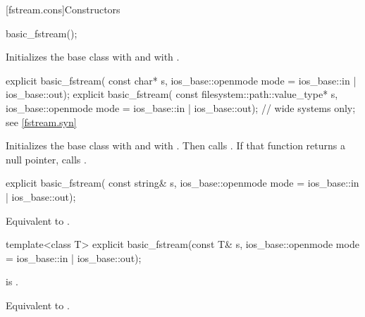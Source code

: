 [fstream.cons]{Constructors}

%
\begin{itemdecl}
basic_fstream();
\end{itemdecl}

\begin{itemdescr}
\pnum
\effects
Initializes the base class with
and
 with .
\end{itemdescr}

%
\begin{itemdecl}
explicit basic_fstream(
  const char* s,
  ios_base::openmode mode = ios_base::in | ios_base::out);
explicit basic_fstream(
  const filesystem::path::value_type* s,
  ios_base::openmode mode = ios_base::in | ios_base::out);  // wide systems only; see \ref{fstream.syn}
\end{itemdecl}

\begin{itemdescr}
\pnum
\effects
Initializes the base class with
and
 with .
Then calls
.
If that function returns a null pointer, calls
.
\end{itemdescr}

%
\begin{itemdecl}
explicit basic_fstream(
  const string& s,
  ios_base::openmode mode = ios_base::in | ios_base::out);
\end{itemdecl}

\begin{itemdescr}
\pnum
\effects
Equivalent to .
\end{itemdescr}

%
\begin{itemdecl}
template<class T>
  explicit basic_fstream(const T& s, ios_base::openmode mode = ios_base::in | ios_base::out);
\end{itemdecl}

\begin{itemdescr}
\pnum
\constraints
{} is .

\pnum
\effects
Equivalent to .
\end{itemdescr}

